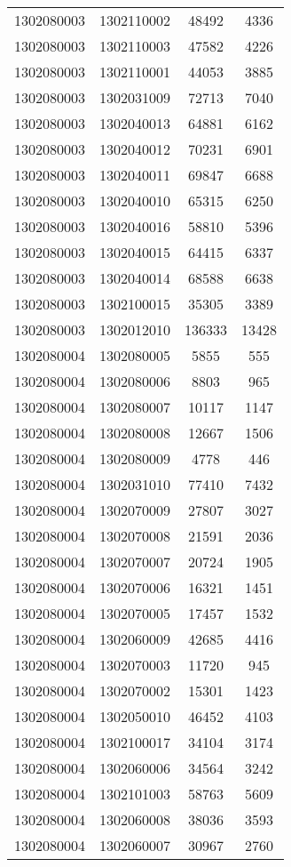 \begin{longtable}{llcc}
1302080003 & 1302110002 & 48492 & 4336\\
1302080003 & 1302110003 & 47582 & 4226\\
1302080003 & 1302110001 & 44053 & 3885\\
1302080003 & 1302031009 & 72713 & 7040\\
1302080003 & 1302040013 & 64881 & 6162\\
1302080003 & 1302040012 & 70231 & 6901\\
1302080003 & 1302040011 & 69847 & 6688\\
1302080003 & 1302040010 & 65315 & 6250\\
1302080003 & 1302040016 & 58810 & 5396\\
1302080003 & 1302040015 & 64415 & 6337\\
1302080003 & 1302040014 & 68588 & 6638\\
1302080003 & 1302100015 & 35305 & 3389\\
1302080003 & 1302012010 & 136333 & 13428\\
1302080004 & 1302080005 & 5855 & 555\\
1302080004 & 1302080006 & 8803 & 965\\
1302080004 & 1302080007 & 10117 & 1147\\
1302080004 & 1302080008 & 12667 & 1506\\
1302080004 & 1302080009 & 4778 & 446\\
1302080004 & 1302031010 & 77410 & 7432\\
1302080004 & 1302070009 & 27807 & 3027\\
1302080004 & 1302070008 & 21591 & 2036\\
1302080004 & 1302070007 & 20724 & 1905\\
1302080004 & 1302070006 & 16321 & 1451\\
1302080004 & 1302070005 & 17457 & 1532\\
1302080004 & 1302060009 & 42685 & 4416\\
1302080004 & 1302070003 & 11720 & 945\\
1302080004 & 1302070002 & 15301 & 1423\\
1302080004 & 1302050010 & 46452 & 4103\\
1302080004 & 1302100017 & 34104 & 3174\\
1302080004 & 1302060006 & 34564 & 3242\\
1302080004 & 1302101003 & 58763 & 5609\\
1302080004 & 1302060008 & 38036 & 3593\\
1302080004 & 1302060007 & 30967 & 2760\\

\end{longtable}
